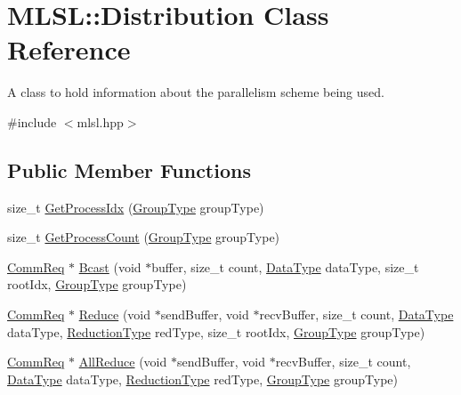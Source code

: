 \hypertarget{classMLSL_1_1Distribution}{\section{M\-L\-S\-L\-:\-:Distribution Class Reference}
\label{classMLSL_1_1Distribution}
}


A class to hold information about the parallelism scheme being used.  




{\ttfamily \#include $<$mlsl.\-hpp$>$}

\subsection*{Public Member Functions}
\begin{DoxyCompactItemize}
\item 
size\-\_\-t \hyperlink{classMLSL_1_1Distribution_a477e334955de1821d6df50a0ff79b299}{Get\-Process\-Idx} (\hyperlink{namespaceMLSL_a9629292da8a376647d4b14a34cda9b95}{Group\-Type} group\-Type)
\item 
size\-\_\-t \hyperlink{classMLSL_1_1Distribution_af5383f6bb85dec6dacc571320723c3e4}{Get\-Process\-Count} (\hyperlink{namespaceMLSL_a9629292da8a376647d4b14a34cda9b95}{Group\-Type} group\-Type)
\item 
\hyperlink{namespaceMLSL_aaf6e40eb1d3e48bb109f529d625e4087}{Comm\-Req} $\ast$ \hyperlink{classMLSL_1_1Distribution_a3b8a002da3ec6f6e72bcc13064257df8}{Bcast} (void $\ast$buffer, size\-\_\-t count, \hyperlink{namespaceMLSL_a09825f36959e78645dd9bc70bdf840ba}{Data\-Type} data\-Type, size\-\_\-t root\-Idx, \hyperlink{namespaceMLSL_a9629292da8a376647d4b14a34cda9b95}{Group\-Type} group\-Type)
\item 
\hyperlink{namespaceMLSL_aaf6e40eb1d3e48bb109f529d625e4087}{Comm\-Req} $\ast$ \hyperlink{classMLSL_1_1Distribution_ac22445628780dfce8120f617d9d0b45b}{Reduce} (void $\ast$send\-Buffer, void $\ast$recv\-Buffer, size\-\_\-t count, \hyperlink{namespaceMLSL_a09825f36959e78645dd9bc70bdf840ba}{Data\-Type} data\-Type, \hyperlink{namespaceMLSL_a6513313f07b5a1b8b93ee7dd5557b27c}{Reduction\-Type} red\-Type, size\-\_\-t root\-Idx, \hyperlink{namespaceMLSL_a9629292da8a376647d4b14a34cda9b95}{Group\-Type} group\-Type)
\item 
\hyperlink{namespaceMLSL_aaf6e40eb1d3e48bb109f529d625e4087}{Comm\-Req} $\ast$ \hyperlink{classMLSL_1_1Distribution_af3c4ce169214ee560ee83a0d7e8445a0}{All\-Reduce} (void $\ast$send\-Buffer, void $\ast$recv\-Buffer, size\-\_\-t count, \hyperlink{namespaceMLSL_a09825f36959e78645dd9bc70bdf840ba}{Data\-Type} data\-Type, \hyperlink{namespaceMLSL_a6513313f07b5a1b8b93ee7dd5557b27c}{Reduction\-Type} red\-Type, \hyperlink{namespaceMLSL_a9629292da8a376647d4b14a34cda9b95}{Group\-Type} group\-Type)

\end{DoxyCompactItemize}
